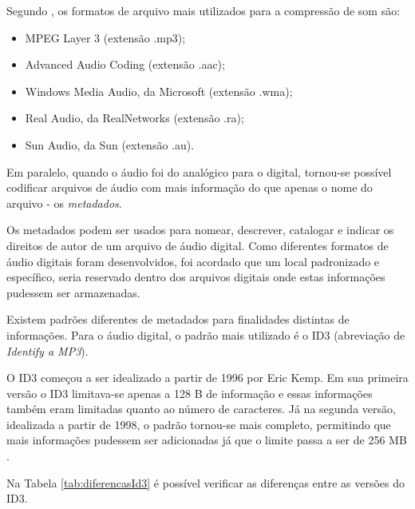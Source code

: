 Segundo , os formatos de arquivo mais utilizados para a compressão de som são:

\begin{itemize}
    \item MPEG Layer 3 (extensão .mp3);
    \item Advanced Audio Coding (extensão .aac);
    \item Windows Media Audio, da Microsoft (extensão .wma);
    \item Real Audio, da RealNetworks (extensão .ra);
    \item Sun Audio, da Sun (extensão .au).
\end{itemize}

Em paralelo, quando o áudio foi do analógico para o digital, tornou-se possível codificar arquivos de áudio com mais informação do que apenas o nome do arquivo - os \textit{metadados}.

Os metadados podem ser usados para nomear, descrever, catalogar e indicar os direitos de autor de um arquivo de áudio digital. Como diferentes formatos de áudio digitais foram desenvolvidos, foi acordado que um local padronizado e específico, seria reservado dentro dos arquivos digitais onde estas informações pudessem ser armazenadas.

Existem padrões diferentes de metadados para finalidades distintas de informações. Para o áudio digital, o padrão mais utilizado é o ID3 (abreviação de \textit{Identify a MP3}). 

O ID3 começou a ser idealizado a partir de 1996 por Eric Kemp. Em sua primeira versão o ID3 limitava-se apenas a 128 B  de informação e essas informações também eram limitadas quanto ao número de caracteres. Já na segunda versão, idealizada a partir de 1998, o padrão tornou-se mais completo, permitindo que mais informações pudessem ser adicionadas já que o limite passa a ser de 256 MB  \cite{ferreira2015}.

Na Tabela \ref{tab:diferencasId3} é possível verificar as diferenças entre as versões do ID3.

